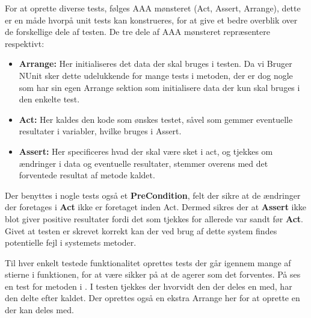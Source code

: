 For at oprette diverse tests, følges AAA mønsteret (Act, Assert, Arrange), dette er en måde hvorpå unit tests kan konstrueres, for at give et bedre overblik over de forskellige dele af testen.
\citep{Writing_Your_Tests}
De tre dele af AAA mønsteret repræsentere respektivt:
\begin{itemize}
  \item \textbf{Arrange:} Her initialiseres det data der skal bruges i testen. Da vi Bruger NUnit sker dette udelukkende for mange tests i  metoden, der er dog nogle som har sin egen Arrange sektion som initialisere data der kun skal bruges i den enkelte test.
  \item \textbf{Act:} Her kaldes den kode som ønskes testet, såvel som gemmer eventuelle resultater i variabler, hvilke bruges i Assert.
  \item \textbf{Assert:} Her specificeres hvad der skal være sket i act, og tjekkes om ændringer i data og eventuelle resultater, stemmer overens med det forventede resultat af metode kaldet.
\end{itemize}
Der benyttes i nogle tests også et \textbf{PreCondition}, felt der sikre at de ændringer der foretages i \textbf{Act} ikke er foretaget inden Act. 
Dermed sikres der at \textbf{Assert} ikke blot giver positive resultater fordi det som tjekkes for allerede var sandt før \textbf{Act}.
Givet at testen er skrevet korrekt kan der ved brug af dette system findes potentielle fejl i systemets metoder.


Til hver enkelt testede funktionalitet oprettes tests der går igennem mange af stierne i funktionen, for at være sikker på at de  agerer som det forventes.
På  ses en test for metoden  i . I testen tjekkes der hvorvidt den  der deles en  med, har den delte  efter kaldet.
Der oprettes også en ekstra Arrange her for at oprette en  der kan deles med.

